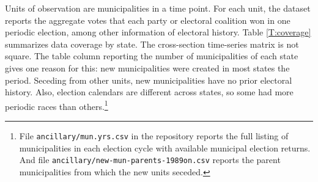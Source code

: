 \documentclass[letter,12pt]{article}
\begin{document}
Units of observation are municipalities in a time point. For each unit, the dataset reports the aggregate votes that each party or electoral coalition won in one periodic election, among other information of electoral history. Table \ref{T:coverage} summarizes data coverage by state. The cross-section time-series matrix is not square. The table column reporting the number of municipalities of each state gives one reason for this: new municipalities were created in most states the period. Seceding from other units, new municipalities have no prior electoral history. Also, election calendars are different across states, so some had more periodic races than others.\footnote{File \verb|ancillary/mun.yrs.csv| in the repository reports the full listing of municipalities in each election cycle with available municipal election returns. And file \verb|ancillary/new-mun-parents-1989on.csv| reports the parent municipalities from which the new units seceded.}
\end{document}
